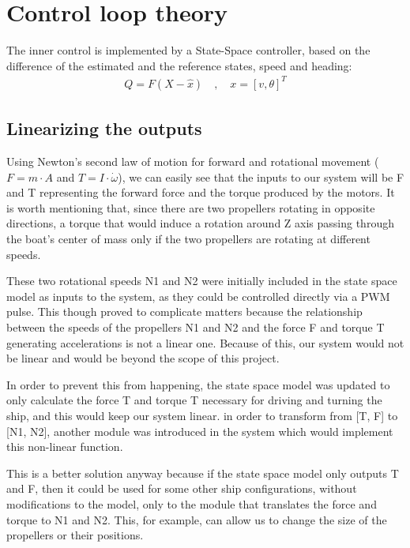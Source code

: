 \section{Control loop theory}

The inner control is implemented by a State-Space controller, based on the difference of the estimated and the reference states, speed and heading:
\begin{align}
Q = F(X-\hat{x}) \quad , \quad x = [v, \theta]^T
\end{align}

\subsection{Linearizing the outputs}

Using Newton's second law of motion for forward  and rotational movement ($F = m \cdot A$ and $T = I \cdot \dot{\omega}$), we can easily see that the inputs to our system will be F and T representing the forward force and the torque produced by the motors. It is worth mentioning that, since there are two propellers rotating in opposite directions, a torque that would induce a rotation around Z axis passing through the boat's center of mass only if the two propellers are rotating at different speeds.

These two rotational speeds N1 and N2 were initially included in the state space model as inputs to the system, as they could be controlled directly via a PWM pulse. This though proved to complicate matters because the relationship between the speeds of the propellers N1 and N2 and the force F and torque T generating accelerations is not a linear one. Because of this, our system would not be linear and would be beyond the scope of this project. 


In order to prevent this from happening, the state space model was updated to only calculate the force T and torque T necessary for driving and turning the ship, and this would keep our system linear. in order to transform from [T, F] to [N1, N2], another module was introduced in the system which would implement this non-linear function. 

This is a better solution anyway because if the state space model only outputs T and F, then it could be used for some other ship configurations, without modifications to the model, only to the module that translates the force and torque to N1 and N2. This, for example, can allow us to change the size of the propellers or their positions.

